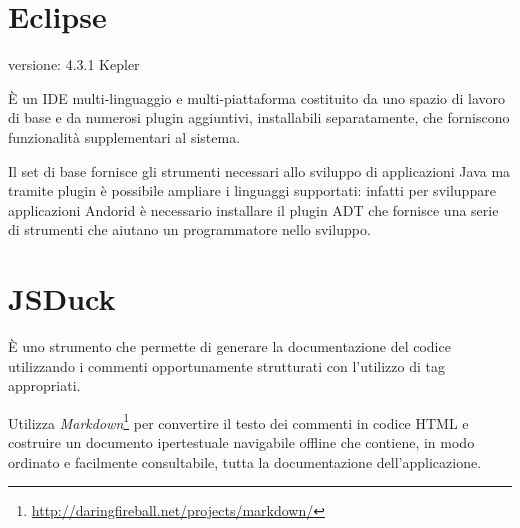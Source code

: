 \section{Eclipse}
\begin{description}
\item[versione: 4.3.1 Kepler]
\end{description}

È un \ac{IDE} multi-linguaggio e multi-piattaforma costituito da uno spazio di lavoro di base e da numerosi plugin aggiuntivi, installabili separatamente, che forniscono funzionalità supplementari al sistema.

Il set di base fornisce gli strumenti necessari allo sviluppo di applicazioni Java ma tramite plugin è possibile ampliare i linguaggi supportati: infatti per sviluppare applicazioni Andorid è necessario installare il plugin \ac{ADT} che fornisce una serie di strumenti che aiutano un programmatore nello sviluppo.

\section{JSDuck}
È uno strumento che permette di generare la documentazione del codice utilizzando i commenti opportunamente strutturati con l'utilizzo di tag appropriati.

Utilizza \emph{Markdown}\footnote{\url{http://daringfireball.net/projects/markdown/}} per convertire il testo dei commenti in codice \ac{HTML} e costruire un documento ipertestuale navigabile offline che contiene, in modo ordinato e facilmente consultabile, tutta la documentazione dell'applicazione.